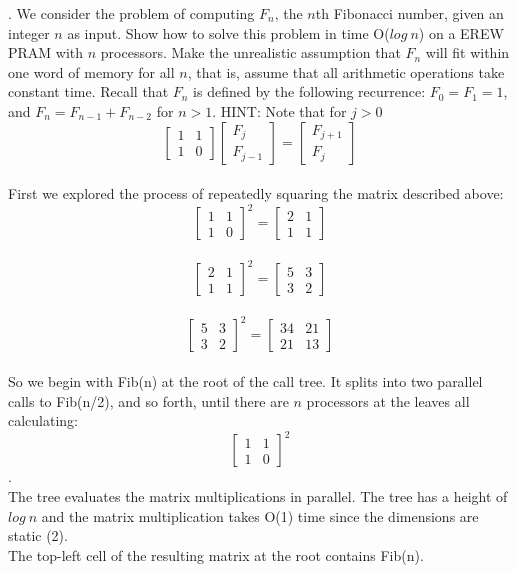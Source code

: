 \documentclass[10pt]{article}
\begin{document}
. We consider the problem of computing $F_n$, the $n$th Fibonacci number, given an integer $n$ as input.
Show how to solve this problem in time O($log~n$) on a EREW PRAM with $n$ processors. Make the
unrealistic assumption that $F_n$ will fit within one word of memory for all $n$, that is, assume that
all arithmetic operations take constant time. Recall that $F_n$ is defined by the following recurrence:
$F_{0} = F_{1} = 1$, and $F_{n} = F_{n-1} + F_{n-2}$ for $n > 1$.
HINT: Note that for $j > 0$
\[
\left[ \begin{array}{cc}
1 & 1\\
1 & 0
\end{array} \right]
\left[ \begin{array}{c}
F_j\\
F_{j-1}
\end{array} \right]
=
\left[ \begin{array}{c}
F_{j+1}\\
F_j
\end{array} \right]
\]
\\
First we explored the process of repeatedly squaring the matrix described above:
\[
\left[ \begin{array}{cc}
1 & 1\\
1 & 0
\end{array} \right]^2
=
\left[ \begin{array}{cc}
2 & 1\\
1 & 1
\end{array} \right]
\]
\\
\[
\left[ \begin{array}{cc}
2 & 1\\
1 & 1
\end{array} \right]^2
=
\left[ \begin{array}{cc}
5 & 3\\
3 & 2
\end{array} \right]
\]
\\
\[
\left[ \begin{array}{cc}
5 & 3\\
3 & 2
\end{array} \right]^2
=
\left[ \begin{array}{cc}
34 & 21\\
21 & 13
\end{array} \right]
\]
\\
So we begin with Fib(n) at the root of the call tree. It splits into two parallel calls to Fib(n/2), and so forth,
until there are $n$ processors at the leaves all calculating:\\
\[
\left[ \begin{array}{cc}
1 & 1\\
1 & 0
\end{array} \right]^2
\].
\\
The tree evaluates the matrix multiplications in parallel. The tree has a height of $log~n$ and the matrix
multiplication takes O(1) time since the dimensions are static (2).\\
The top-left cell of the resulting matrix at the root contains Fib(n).\\
\end{document}
